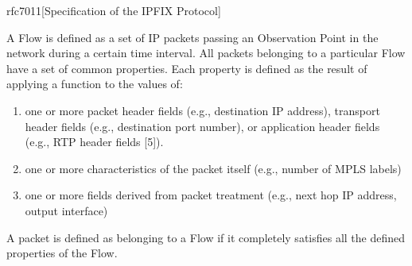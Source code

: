 \begin{displaycquote}{rfc7011}[Specification of the IPFIX Protocol]

    A Flow is defined as a set of IP packets passing an Observation
    Point in the network during a certain time interval.  All packets
    belonging to a particular Flow have a set of common properties.
    Each property is defined as the result of applying a function to
    the values of:

    \begin{enumerate}
    \item one or more packet header fields (e.g., destination IP
        address), transport header fields (e.g., destination port
        number), or application header fields (e.g., RTP header fields
        [5]).

    \item one or more characteristics of the packet itself (e.g., number
        of MPLS labels)

    \item one or more fields derived from packet treatment (e.g., next
        hop IP address, output interface)
    \end{enumerate}
        
    A packet is defined as belonging to a Flow if it completely
    satisfies all the defined properties of the Flow.

\end{displaycquote}

